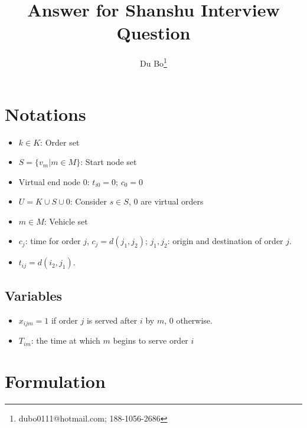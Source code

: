 \documentclass[a4paper]{article}
\title{Answer for Shanshu Interview Question}
\author{Du Bo\thanks{dubo0111@hotmail.com; 188-1056-2686}}
\begin{document}
\maketitle

\section{Notations}
\begin{itemize}
 \item $k\in K$: Order set
 \item $S=\{v_m|m\in M\}$: Start node set
 \item Virtual end node 0: $t_{i0} = 0$; $c_0 =0$
 \item $U = K \cup S  \cup 0$: Consider $s\in S$, $0$ are virtual orders
 \item $m\in M$: Vehicle set
 \item $c_j$: time for order $j$, $c_j = d(j_1,j_2)$; $j_1,j_2$: origin and destination of order $j$.
 \item $t_{ij} = d(i_2,j_1)$.

\end{itemize}

\subsection{Variables}

\begin{itemize}
 \item $x_{ijm}=1$ if order $j$ is served after $i$ by $m$, $0$ otherwise.
 \item $T_{im}$: the time at which $m$ begins to serve order $i$
\end{itemize}

\section{Formulation}
\end{document}

